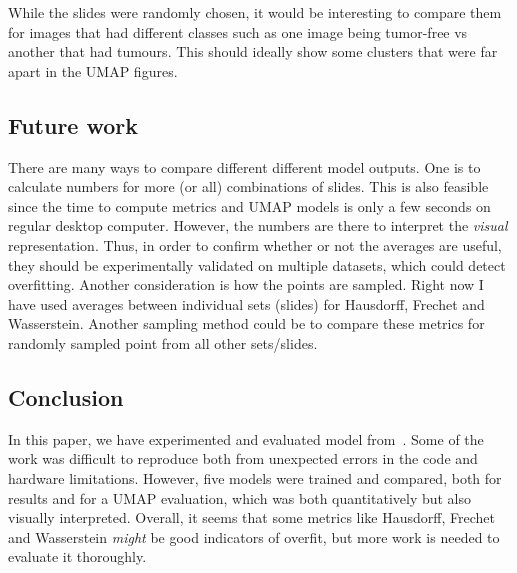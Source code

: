 \documentclass[10pt,twocolumn,letterpaper]{article}
\begin{document}
While the slides were randomly chosen, it would be interesting to compare them for images that had different classes such as one image being tumor-free vs another that had tumours. This should ideally show some clusters that were far apart in the \gls{UMAP} figures.

\subsection{Future work}\label{sec:futurework}
There are many ways to compare different different model outputs. One is to calculate numbers for more (or all) combinations of slides. This is also feasible since the time to compute metrics and \gls{UMAP} models is only a few seconds on regular desktop computer. However, the numbers are there to interpret the \textit{visual} representation. Thus, in order to confirm whether or not the averages are useful, they should be experimentally validated on multiple datasets, which could detect overfitting. Another consideration is how the points are sampled. Right now I have used averages between individual sets (slides) for Hausdorff, Frechet and Wasserstein. Another sampling method could be to compare these metrics for randomly sampled point from all other sets/slides.

\subsection{Conclusion}
In this paper, we have experimented and evaluated model from~\cite{sslUMAP}. Some of the work was difficult to reproduce both from unexpected errors in the code and hardware limitations. However, five models were trained and compared, both for results and for a \gls{UMAP} evaluation, which was both quantitatively but also visually interpreted. Overall, it seems that some metrics like Hausdorff, Frechet and Wasserstein \textit{might} be good indicators of overfit, but more work is needed to evaluate it thoroughly.

{\small


}
\end{document}
